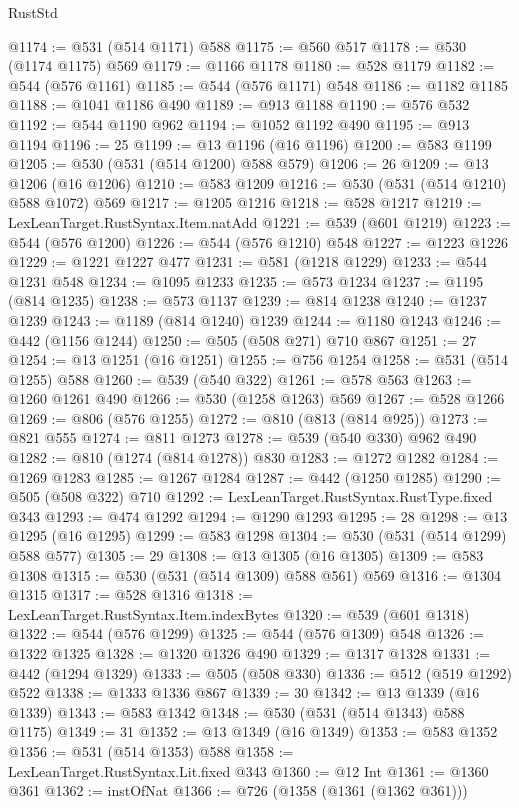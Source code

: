 \begin{lexlean}{RustStd}
\begin{coremodule}
@1174 := @531 (@514 @1171) @588
@1175 := @560 @517
@1178 := @530 (@1174 @1175) @569
@1179 := @1166 @1178
@1180 := @528 @1179
@1182 := @544 (@576 @1161)
@1185 := @544 (@576 @1171) @548
@1186 := @1182 @1185
@1188 := @1041 @1186 @490
@1189 := @913 @1188
@1190 := @576 @532
@1192 := @544 @1190 @962
@1194 := @1052 @1192 @490
@1195 := @913 @1194
@1196 := 25
@1199 := @13 @1196 (@16 @1196)
@1200 := @583 @1199
@1205 := @530 (@531 (@514 @1200) @588 @579)
@1206 := 26
@1209 := @13 @1206 (@16 @1206)
@1210 := @583 @1209
@1216 := @530 (@531 (@514 @1210) @588 @1072) @569
@1217 := @1205 @1216
@1218 := @528 @1217
@1219 := LexLeanTarget.RustSyntax.Item.natAdd
@1221 := @539 (@601 @1219)
@1223 := @544 (@576 @1200)
@1226 := @544 (@576 @1210) @548
@1227 := @1223 @1226
@1229 := @1221 @1227 @477
@1231 := @581 (@1218 @1229)
@1233 := @544 @1231 @548
@1234 := @1095 @1233
@1235 := @573 @1234
@1237 := @1195 (@814 @1235)
@1238 := @573 @1137
@1239 := @814 @1238
@1240 := @1237 @1239
@1243 := @1189 (@814 @1240) @1239
@1244 := @1180 @1243
@1246 := @442 (@1156 @1244)
@1250 := @505 (@508 @271) @710 @867
@1251 := 27
@1254 := @13 @1251 (@16 @1251)
@1255 := @756 @1254
@1258 := @531 (@514 @1255) @588
@1260 := @539 (@540 @322)
@1261 := @578 @563
@1263 := @1260 @1261 @490
@1266 := @530 (@1258 @1263) @569
@1267 := @528 @1266
@1269 := @806 (@576 @1255)
@1272 := @810 (@813 (@814 @925))
@1273 := @821 @555
@1274 := @811 @1273
@1278 := @539 (@540 @330) @962 @490
@1282 := @810 (@1274 (@814 @1278)) @830
@1283 := @1272 @1282
@1284 := @1269 @1283
@1285 := @1267 @1284
@1287 := @442 (@1250 @1285)
@1290 := @505 (@508 @322) @710
@1292 := LexLeanTarget.RustSyntax.RustType.fixed @343
@1293 := @474 @1292
@1294 := @1290 @1293
@1295 := 28
@1298 := @13 @1295 (@16 @1295)
@1299 := @583 @1298
@1304 := @530 (@531 (@514 @1299) @588 @577)
@1305 := 29
@1308 := @13 @1305 (@16 @1305)
@1309 := @583 @1308
@1315 := @530 (@531 (@514 @1309) @588 @561) @569
@1316 := @1304 @1315
@1317 := @528 @1316
@1318 := LexLeanTarget.RustSyntax.Item.indexBytes
@1320 := @539 (@601 @1318)
@1322 := @544 (@576 @1299)
@1325 := @544 (@576 @1309) @548
@1326 := @1322 @1325
@1328 := @1320 @1326 @490
@1329 := @1317 @1328
@1331 := @442 (@1294 @1329)
@1333 := @505 (@508 @330)
@1336 := @512 (@519 @1292) @522
@1338 := @1333 @1336 @867
@1339 := 30
@1342 := @13 @1339 (@16 @1339)
@1343 := @583 @1342
@1348 := @530 (@531 (@514 @1343) @588 @1175)
@1349 := 31
@1352 := @13 @1349 (@16 @1349)
@1353 := @583 @1352
@1356 := @531 (@514 @1353) @588
@1358 := LexLeanTarget.RustSyntax.Lit.fixed @343
@1360 := @12 Int
@1361 := @1360 @361
@1362 := instOfNat
@1366 := @726 (@1358 (@1361 (@1362 @361)))

\end{coremodule}
\end{lexlean}
